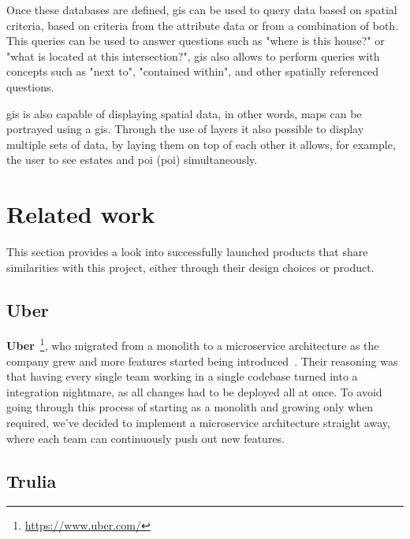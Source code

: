 Once these databases are defined, \acrshort{gis} can be used to query data based on spatial criteria, based on criteria from the attribute data or from a combination of both. This queries can be used to answer questions such as "where is this house?" or "what is located at this intersection?", \acrshort{gis} also allows to perform queries with concepts such as "next to", "contained within", and other spatially referenced questions.

\acrshort{gis} is also capable of displaying spatial data, in other words, maps can be portrayed using a \acrshort{gis}. Through the use of layers it also possible to display multiple sets of data, by laying them on top of each other it allows, for example, the user to see estates and \acrlong{poi} (\acrshort{poi}) simultaneously.





\section{Related work}


This section provides a look into successfully launched products that share similarities with this project, either through their design choices or product.

\subsection{Uber}
\label{ss:uber}

\textbf{Uber}~\footnote{\url{https://www.uber.com/}}, who migrated from a monolith to a microservice architecture as the company grew and more features started being introduced~\cite{uber}. Their reasoning was that having every single team working in a single codebase turned into a integration nightmare, as all changes had to be deployed all at once. To avoid going through this process of starting as a monolith and growing only when required, we've decided to implement a microservice architecture straight away, where each team can continuously push out new features. 

\subsection{Trulia}
\label{ss:trulia}

